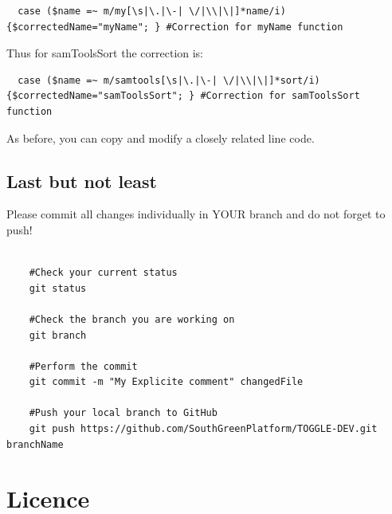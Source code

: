 \documentclass[a4paper,10pt]{report}
\begin{document}
\begin{lstlisting}
  case ($name =~ m/my[\s|\.|\-| \/|\\|\|]*name/i){$correctedName="myName"; } #Correction for myName function
\end{lstlisting}

Thus for samToolsSort the correction is:
\begin{lstlisting}
  case ($name =~ m/samtools[\s|\.|\-| \/|\\|\|]*sort/i){$correctedName="samToolsSort"; } #Correction for samToolsSort function
\end{lstlisting}

As before, you can copy and modify a closely related line code.

\section{Last but not least}

Please commit all changes individually in YOUR branch and do not forget to push!

\begin{verbatim}
 
    #Check your current status
    git status

    #Check the branch you are working on
    git branch

    #Perform the commit
    git commit -m "My Explicite comment" changedFile

    #Push your local branch to GitHub
    git push https://github.com/SouthGreenPlatform/TOGGLE-DEV.git branchName

\end{verbatim}


\appendix

\chapter{Licence}
\end{document}
